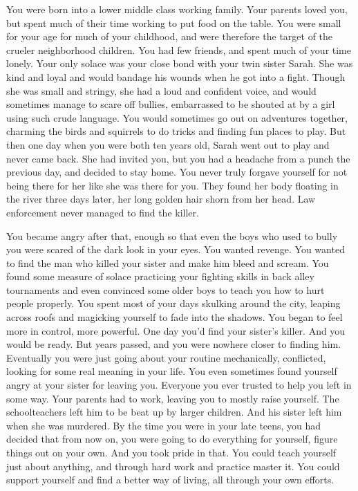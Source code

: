 \documentclass[char]{guildcamp3}
\begin{document}
\name{\cRogueOne{}}

You were born into a lower middle class working family. Your parents loved you, but spent much of their time working to put food on the table. You were small for your age for much of your childhood, and were therefore the target of the crueler neighborhood children. You had few friends, and spent much of your time lonely. Your only solace was your close bond with your twin sister Sarah. She was kind and loyal and would bandage his wounds when he got into a fight. Though she was small and stringy, she had a loud and confident voice, and would sometimes manage to scare off bullies, embarrassed to be shouted at by a girl using such crude language. You would sometimes go out on adventures together, charming the birds and squirrels to do tricks and finding fun places to play. But then one day when you were both ten years old, Sarah went out to play and never came back. She had invited you, but you had a headache from a punch the previous day, and decided to stay home. You never truly forgave yourself for not being there for her like she was there for you. They found her body floating in the river three days later, her long golden hair shorn from her head. Law enforcement never managed to find the killer.

You became angry after that, enough so that even the boys who used to bully you were scared of the dark look in your eyes. You wanted revenge. You wanted to find the man who killed your sister and make him bleed and scream. You found some measure of solace practicing your fighting skills in back alley tournaments and even convinced some older boys to teach you how to hurt people properly. You spent most of your days skulking around the city, leaping across roofs and magicking yourself to fade into the shadows. You began to feel more in control, more powerful. One day you'd find your sister's killer. And you would be ready. But years passed, and you were nowhere closer to finding him. Eventually you were just going about your routine mechanically, conflicted, looking for some real meaning in your life. You even sometimes found yourself angry at your sister for leaving you. Everyone you ever trusted to help you left in some way. Your parents had to work, leaving you to mostly raise yourself. The schoolteachers left him to be beat up by larger children. And his sister left him when she was murdered. By the time you were in your late teens, you had decided that from now on, you were going to do everything for yourself, figure things out on your own. And you took pride in that. You could teach yourself just about anything, and through hard work and practice master it. You could support yourself and find a better way of living, all through your own efforts.
\end{document}
